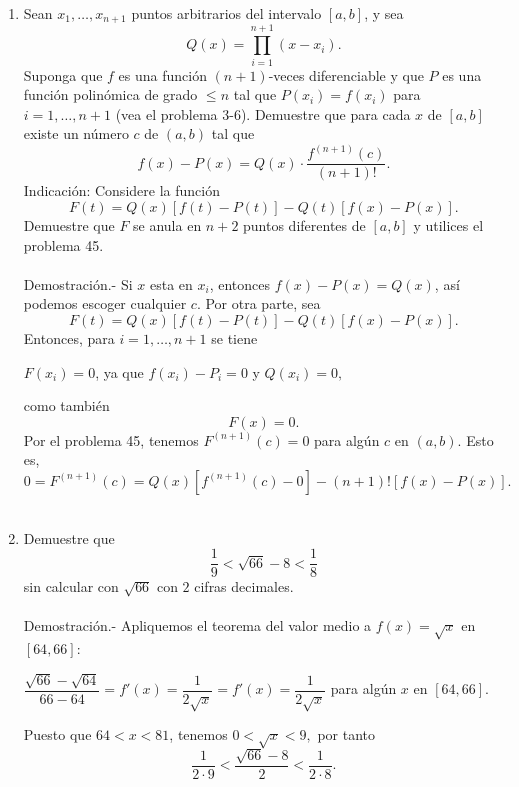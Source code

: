 \begin{enumerate}[\bfseries 1.]
    \item Sean $x_1,\ldots, x_{n+1}$ puntos arbitrarios del intervalo $[a,b]$, y sea
    $$Q(x)=\prod_{i=1}^{n+1}(x-x_i).$$
    Suponga que $f$ es una función $(n+1)$-veces diferenciable y que $P$ es una función polinómica de grado $\leq n$ tal que $P(x_i)=f(x_i)$ para $i=1,\ldots,n+1$ (vea el problema 3-6). Demuestre que para cada $x$ de $[a,b]$ existe un número $c$ de $(a,b)$ tal que
    $$f(x)-P(x)=Q(x)\cdot \dfrac{f^{(n+1)}(c)}{(n+1)!}.$$
    Indicación: Considere la función 
    $$F(t)=Q(x)[f(t)-P(t)]-Q(t)[f(x)-P(x)].$$
    Demuestre que $F$ se anula en $n+2$ puntos diferentes de $[a,b]$ y utilices el problema 45.\\\\
	Demostración.-\; Si $x$ esta en $x_i$, entonces $f(x)-P(x)=Q(x)$, así podemos escoger cualquier $c$. Por otra parte, sea
	$$F(t)=Q(x)\left[f(t)-P(t)\right]-Q(t)\left[f(x)-P(x)\right].$$
	Entonces, para $i=1,\ldots , n+1$ se tiene
	\begin{center}
	    $F(x_i)=0$, ya que $f(x_i)-P_i=0$ y $Q(x_i)=0,$
	\end{center}
	como también
	$$F(x)=0.$$
	Por el problema 45, tenemos $F^{(n+1)}(c)=0$ para algún $c$ en $(a,b)$. Esto es,
	$$0=F^{(n+1)}(c)=Q(x)\left[f^{(n+1)}(c)-0\right]-(n+1)!\left[f(x)-P(x)\right].$$\\

    \item Demuestre que 
    $$\dfrac{1}{9}<\sqrt{66}-8<\dfrac{1}{8}$$
    sin calcular con $\sqrt{66}$ con $2$ cifras decimales.\\\\
	Demostración.-\; Apliquemos el teorema del valor medio a $f(x)=\sqrt{x}$ en $[64,66]$:
	\begin{center}
	    $\dfrac{\sqrt{66}-\sqrt{64}}{66-64}=f'(x)=\dfrac{1}{2\sqrt{x}} = f'(x) = \dfrac{1}{2\sqrt{x}}$ para algún $x$ en $[64,66]$.
	\end{center}
	Puesto que $64<x<81$, tenemos $0<\sqrt{x}<9,$ por tanto
	$$\dfrac{1}{2\cdot 9}<\dfrac{\sqrt{66}-8}{2}<\dfrac{1}{2\cdot 8}.$$\\


\end{enumerate}
